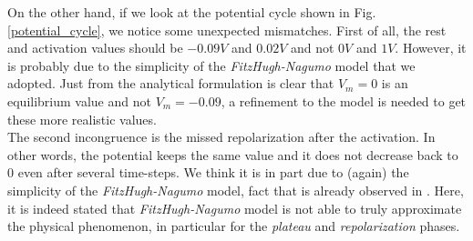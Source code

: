 \documentclass[a4paper,11pt]{article}
\begin{document}
\noindent On the other hand, if we look at the potential cycle shown in Fig. \ref{potential_cycle}, we notice some unexpected mismatches. First of all, the rest and activation values should be $-0.09V$ and $0.02V$ and not $0V$ and $1V$. However, it is probably due to the simplicity of the \emph{FitzHugh-Nagumo} model that we adopted. Just from the analytical formulation is clear that $V_m=0$ is an equilibrium value and not $V_m=-0.09$, a refinement to the model is needed to get these more realistic values. \\
The second incongruence is the missed repolarization after the activation. In other words, the potential keeps the same value and it does not decrease back to 0 even after several time-steps. We think it is in part due to (again) the simplicity of the \emph{FitzHugh-Nagumo} model, fact that is already observed in \cite{colli_franzone_parallel}. Here, it is indeed stated that \emph{FitzHugh-Nagumo} model is not able to truly approximate the physical phenomenon, in particular for the \emph{plateau} and \emph{repolarization} phases.
\end{document}

